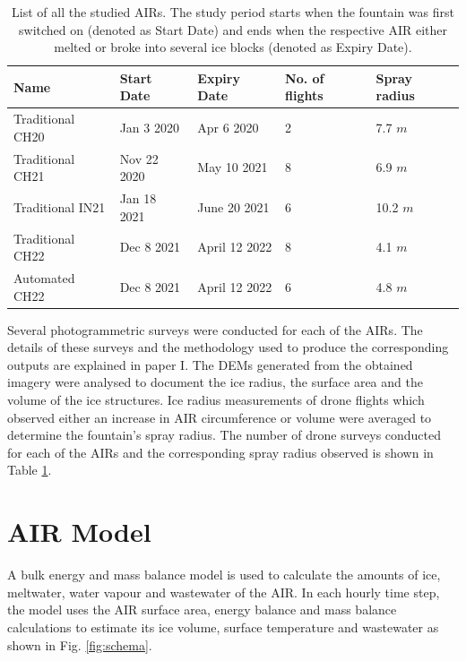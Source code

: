 \begin{table}
  \centering
  \caption{List of all the studied \ac{AIRs}. The study period starts when the fountain was first switched on
  (denoted as Start Date) and ends when the respective AIR either melted or broke into several ice blocks
(denoted as Expiry Date). }
	\label{tab:AIRs}
	\begin{tabular}{|lllll|}
    \hline
		\textbf{Name}     & \textbf{Start Date} & \textbf{Expiry Date} & \textbf{No. of flights} & \textbf{Spray
    radius} \\ \hline
    Traditional CH20  & Jan 3 2020 & Apr 6 2020 & 2 & 7.7 $m$ \\
    Traditional CH21  & Nov 22 2020   & May 10 2021 & 8 & 6.9 $m$ \\
    Traditional IN21  & Jan 18 2021   & June 20 2021 & 6 & 10.2 $m$ \\
    Traditional CH22  & Dec 8 2021 & April 12 2022 & 8 & 4.1 $m$ \\
		Automated CH22  &  Dec 8 2021 & April 12 2022 & 6 & 4.8 $m$ \\ \hline
	\end{tabular}
\end{table}


Several photogrammetric surveys were conducted for each of the \ac{AIRs}. The details of these surveys and the
methodology used to produce the corresponding outputs are explained in paper I. The 
\ac{DEMs} generated from the obtained imagery were analysed to document the ice radius, the surface area and the
volume of the ice structures. Ice radius measurements of drone flights which observed either an increase in AIR
circumference or volume were averaged to determine the fountain's spray radius. The number of drone surveys
conducted for each of the AIRs and the corresponding spray radius observed is shown in Table \ref{tab:AIRs}. 

\section{AIR Model}

A bulk energy and mass balance model is used to calculate the amounts of ice, meltwater, water vapour and
wastewater of the AIR. In each hourly time step, the model uses the AIR surface area, energy balance and mass
balance calculations to estimate its ice volume, surface temperature and wastewater as shown in Fig.
\ref{fig:schema}.

